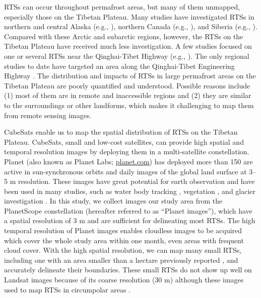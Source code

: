 \documentclass[authoryear,preprint,review,12pt]{elsarticle}
\begin{document}
RTSs can occur throughout permafrost areas, but many of them  unmapped, especially those on the Tibetan Plateau. Many studies have investigated RTSs in northern and central Alaska (e.g., \citealp{swanson2018growth,balser2014timing}), northern Canada (e.g., \citealp{burn1990canadian, cassidy2017impacts, armstrong2018thaw,lewkowicz2019extremes}), and Siberia (e.g., \citealp{leibman2003dynamics, zwieback2018sub}). %
Compared with these Arctic and subarctic regions, however, the RTSs on the Tibetan Plateau have received much less investigation. 
A few studies focused on one or several RTSs near the Qinghai-Tibet Highway (e.g., \citealp{wang1995situ,sun2017creep}). The only regional studies to date have targeted an area along the Qinghai-Tibet Engineering Highway . 
The distribution and impacts of RTSs in large permafrost areas on the Tibetan Plateau are poorly quantified and understood. 
Possible reasons include (1) most of them are in remote and inaccessible regions and (2) they are similar to the surroundings or other landforms, which makes it challenging to map them from remote sensing images.

 CubeSats enable us to map the spatial distribution of RTSs on the Tibetan Plateau. CubeSats, small and low-cost satellites, can provide high spatial and temporal resolution images by deploying them in a multi-satellite constellation.  Planet (also known as Planet Labs; \url{planet.com}) has deployed  more than 150  are active in sun-synchronous orbits and  daily images  of the global land surface at 3--5 m resolution. These images have great potential for earth observation and have been used in many studies, such as water body tracking \citep{cooley2017tracking, cooley2019arctic, aragon2018cubesats, miles2018glacial}, vegetation \citep{houborg2016high, houborg2018daily}, and glacier investigation \citep{altena2017glacier}. In this study, we collect images  our study area from the PlanetScope constellation (hereafter referred to as “Planet images”), which have a spatial resolution of 3 m and are sufficient for delineating most RTSs. The high temporal resolution of Planet images enables cloudless images to be acquired which cover the whole study area within one month, even  areas with frequent cloud cover. With the high spatial resolution, we can map many small RTSs, including one with an area smaller than a hectare previously reported  \cite{niu2012development,niu2016thaw}, and accurately delineate their boundaries. These small RTSs do not show up well on Landsat images because of its coarse resolution (30 m) although these images  used to map RTSs  in circumpolar areas \citep{lacelle_distribution_2015, brooker2014mapping, nitze2018remote}. %
\end{document}
